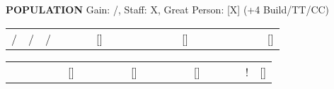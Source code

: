 \begin{flushleft}
  \textbf{POPULATION} {\color{supplemental} Gain: /, Staff: X, Great Person: [X] (+4 Build/TT/CC)}
\end{flushleft}
\begin{tabular}{|c|c|c|c|c|c|c|c|c|c|c|c|c|c|c|c|c|c|c|c|c}
\cline{1-6} \cline{8-13} \cline{15-20}
/ &
/ & /
&
&
&
& {[}{]}
&
&
&
&
&
&
& {[}{]}
&
&
&
&
&
&
& {[}{]} \\ \cline{1-6} \cline{8-13} \cline{15-20}
\end{tabular}
\newline\newline
\begin{tabular}{|c|c|c|c|c|c|c|c|c|c|c|c|c|c|c|c|c|c|c|c|c}
\cline{1-5} \cline{7-10} \cline{12-15} \cline{17-20}
 &
 &
 &
 &
 & {[}{]}
 &
 &
 &
 &
 & {[}{]}
 &
 &
 &
 &
 & {[}{]}
 &
 &
 &
 & !
 & {[}{]} \\ \cline{1-5} \cline{7-10} \cline{12-15} \cline{17-20}
\end{tabular}
